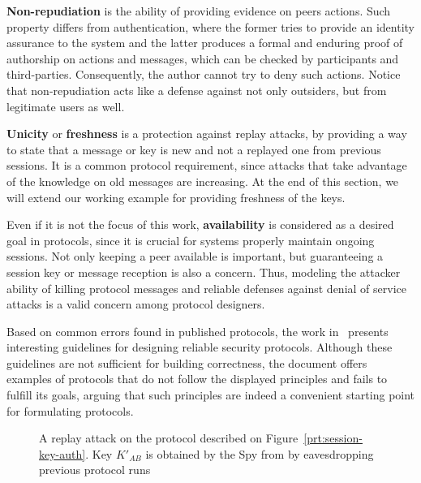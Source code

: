 \textbf{Non-repudiation} is the ability of providing evidence on peers actions. Such property differs from authentication, where the former tries to provide an identity assurance to the system and the latter produces a formal and enduring proof of authorship on actions and messages, which can be checked by participants and third-parties. Consequently, the author cannot try to deny such actions. Notice that non-repudiation acts like a defense against not only outsiders, but from legitimate users as well.

\textbf{Unicity} or \textbf{freshness} is a protection against replay attacks, by providing a way to state that a message or key is new and not a replayed one from previous sessions. It is a common protocol requirement, since attacks that take advantage of the knowledge on old messages are increasing. At the end of this section, we will extend our working example for providing freshness of the keys.

Even if it is not the focus of this work, \textbf{availability} is considered as a desired goal in protocols, since it is crucial for systems properly maintain ongoing sessions. Not only keeping a peer available is important, but guaranteeing a session key or message reception is also a concern. Thus, modeling the attacker ability of killing protocol messages and reliable defenses against denial of service attacks is a valid concern among protocol designers.

Based on common errors found in published protocols, the work in~\cite{AbadiNeedham96} presents interesting guidelines for designing reliable security protocols. Although these guidelines are not sufficient for building correctness, the document offers examples of protocols that do not follow the displayed principles and fails to fulfill its goals, arguing that such principles are indeed a convenient starting point for formulating protocols.

\begin{figure}[!ht]\label{fig:attack-ex-replay}
  \centering

  \caption{A replay attack on the protocol described on Figure~\ref{prt:session-key-auth}. Key \(K'_{AB}\) is obtained by the Spy from by eavesdropping previous protocol runs}
\end{figure}


